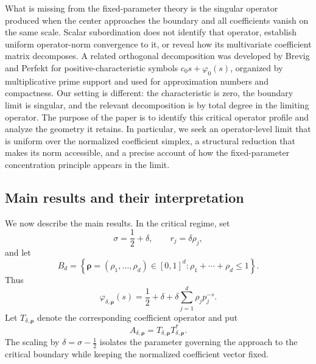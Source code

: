 \documentclass[12pt, reqno]{amsart}
\numberwithin{equation}{section}
\begin{document}
What is missing from the fixed-parameter theory is the singular operator
produced when the center approaches the boundary and all coefficients
vanish on the same scale.  Scalar subordination does not identify that
operator, establish uniform operator-norm convergence to it, or reveal how
its multivariate coefficient matrix decomposes.  A related orthogonal
decomposition was developed by Brevig and Perfekt \cite{BP2022} for
positive-characteristic symbols \(c_0s+\varphi_0(s)\), organized by
multiplicative prime support and used for approximation numbers and
compactness.  Our setting is different: the characteristic is zero, the
boundary limit is singular, and the relevant decomposition is by total
degree in the limiting operator.  The purpose of the paper is to
identify this critical operator profile and analyze the geometry it
retains.  In particular, we seek an operator-level limit that is uniform
over the normalized coefficient simplex, a structural reduction that makes
its norm accessible, and a precise account of how the fixed-parameter
concentration principle appears in the limit.

\subsection{Main results and their interpretation}

We now describe the main results. In the critical regime, set
\[
\sigma=\frac12+\delta,
\qquad
r_j=\delta\rho_j,
\]
and let
\[
B_d
=
\left\{
\boldsymbol\rho=(\rho_1,\ldots,\rho_d)\in[0,1]^d:
\rho_1+\cdots+\rho_d\leq1
\right\}.
\]
Thus
\[
\varphi_{\delta,\boldsymbol\rho}(s)
=
\frac12+\delta
+
\delta\sum_{j=1}^d\rho_jp_j^{-s}.
\]
Let $T_{\delta,\boldsymbol\rho}$ denote the corresponding coefficient
operator and put
\[
A_{\delta,\boldsymbol\rho}
=
T_{\delta,\boldsymbol\rho}
T_{\delta,\boldsymbol\rho}^*.
\]
The scaling by $\delta=\sigma-\frac12$ isolates the parameter governing
the approach to the critical boundary while keeping the normalized
coefficient vector fixed.
\end{document}
